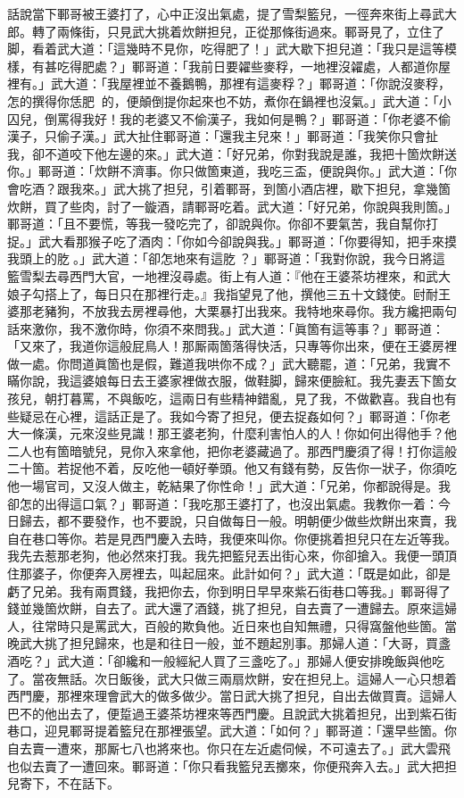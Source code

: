 話說當下鄆哥被王婆打了，心中正沒出氣處，提了雪梨籃兒，一徑奔來街上尋武大郎。轉了兩條街，只見武大挑着炊餅担兒，正從那條街過來。鄆哥見了，立住了脚，看着武大道：「這幾時不見你，吃得肥了！」武大歇下担兒道：「我只是這等模樣，有甚吃得肥處？」鄆哥道：「我前日要糴些麥稃，一地裡沒糴處，人都道你屋裡有。」武大道：「我屋裡並不養鵝鴨，那裡有這麥稃？」鄆哥道：「你說沒麥稃，怎的撰得你恁肥𦞂𦞂的，便顛倒提你起來也不妨，煮你在鍋裡也沒氣。」{}武大道：「小囚兒，倒罵得我好！我的老婆又不偷漢子，{}我如何是鴨？」鄆哥道：「你老婆不偷漢子，只偷子漢。」武大扯住鄆哥道：「還我主兒來！」鄆哥道：「我笑你只會扯我，卻不道咬下他左邊的來。」武大道：「好兄弟，你對我說是誰，我把十箇炊餅送你。」鄆哥道：「炊餅不濟事。你只做箇東道，我吃三盃，便說與你。」武大道：「你會吃酒？跟我來。」武大挑了担兒，引着鄆哥，到箇小酒店裡，歇下担兒，拿幾箇炊餅，買了些肉，討了一鏇酒，請鄆哥吃着。武大道：「好兄弟，你說與我則箇。」鄆哥道：「且不要慌，等我一發吃完了，卻說與你。你卻不要氣苦，我自幫你打捉。」武大看那猴子吃了酒肉：「你如今卻說與我。」鄆哥道：「你要得知，把手來摸我頭上的肐𦞂。」武大道：「卻怎地來有這肐𦞂？」鄆哥道：「我對你說，我今日將這籃雪梨去尋西門大官，一地裡沒尋處。街上有人道：『他在王婆茶坊裡來，和武大娘子勾搭上了，每日只在那裡行走。』我指望見了他，撰他三五十文錢使。尀耐王婆那老豬狗，不放我去房裡尋他，大栗暴打出我來。我特地來尋你。我方纔把兩句話來激你，我不激你時，你須不來問我。」武大道：「眞箇有這等事？」鄆哥道：「又來了，我道你這般屁鳥人！那厮兩箇落得快活，只專等你出來，便在王婆房裡做一處。你問道眞箇也是假，難道我哄你不成？」武大聽罷，道：「兄弟，我實不瞞你說，我這婆娘每日去王婆家裡做衣服，做鞋脚，歸來便臉紅。我先妻丟下箇女孩兒，朝打暮罵，不與飯吃，這兩日有些精神錯亂，見了我，不做歡喜。我自也有些疑忌在心裡，這話正是了。我如今寄了担兒，便去捉姦如何？」鄆哥道：「你老大一條漢，元來沒些見識！那王婆老狗，什麼利害怕人的人！你如何出得他手？他二人也有箇暗號兒，見你入來拿他，把你老婆藏過了。那西門慶須了得！打你這般二十箇。若捉他不着，反吃他一頓好拳頭。他又有錢有勢，反告你一狀子，你須吃他一場官司，又沒人做主，乾結果了你性命！」{}武大道：「兄弟，你都說得是。我卻怎的出得這口氣？」鄆哥道：「我吃那王婆打了，也沒出氣處。我教你一着：今日歸去，都不要發作，也不要說，只自做每日一般。明朝便少做些炊餅出來賣，我自在巷口等你。若是見西門慶入去時，我便來叫你。你便挑着担兒只在左近等我。我先去惹那老狗，他必然來打我。我先把籃兒丟出街心來，你卻搶入。我便一頭頂住那婆子，你便奔入房裡去，叫起屈來。此計如何？」武大道：「既是如此，卻是虧了兄弟。我有兩貫錢，我把你去，你到明日早早來紫石街巷口等我。」鄆哥得了錢並幾箇炊餅，自去了。武大還了酒錢，挑了担兒，自去賣了一遭歸去。原來這婦人，往常時只是罵武大，百般的欺負他。近日來也自知無禮，只得窩盤他些箇。{}當晚武大挑了担兒歸來，也是和往日一般，並不題起別事。那婦人道：「大哥，買盞酒吃？」武大道：「卻纔和一般經紀人買了三盞吃了。」那婦人便安排晚飯與他吃了。當夜無話。次日飯後，武大只做三兩扇炊餅，安在担兒上。這婦人一心只想着西門慶，那裡來理會武大的做多做少。當日武大挑了担兒，自出去做買賣。這婦人巴不的他出去了，便踅過王婆茶坊裡來等西門慶。且說武大挑着担兒，出到紫石街巷口，迎見鄆哥提着籃兒在那裡張望。{}武大道：「如何？」鄆哥道：「還早些箇。你自去賣一遭來，那厮七八也將來也。你只在左近處伺候，不可遠去了。」武大雲飛也似去賣了一遭回來。鄆哥道：「你只看我籃兒丟擲來，你便飛奔入去。」武大把担兒寄下，不在話下。

